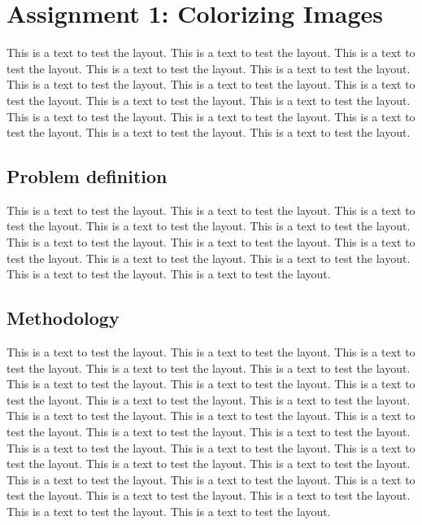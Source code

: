 \documentclass[a4paper,psfig,subfigure,epsfig,fleqn,ausarbeitung,amssmb,float,caption,fontenc]{article}
\begin{document}
\section{Assignment 1: Colorizing Images}
\label{sec:assignment1}

This is a text to test the layout. This is a text to test the layout.
This is a text to test the layout.  This is a text to test the layout.
This is a text to test the layout. This is a text to test the layout.
This is a text to test the layout. This is a text to test the layout.
This is a text to test the layout.  This is a text to test the layout.
This is a text to test the layout. This is a text to test the layout.
This is a text to test the layout. This is a text to test the layout.
This is a text to test the layout.

\subsection{Problem definition}

This is a text to test the layout. This is a text to test the layout.
This is a text to test the layout.  This is a text to test the layout.
This is a text to test the layout. This is a text to test the layout.
This is a text to test the layout. This is a text to test the layout.
This is a text to test the layout.  This is a text to test the layout.
This is a text to test the layout. This is a text to test the layout.

\subsection{Methodology}

This is a text to test the layout. This is a text to test the layout.
This is a text to test the layout.  This is a text to test the layout.
This is a text to test the layout. This is a text to test the layout.
This is a text to test the layout. This is a text to test the layout.
This is a text to test the layout.  This is a text to test the layout.
This is a text to test the layout. This is a text to test the layout.
This is a text to test the layout. This is a text to test the layout.
This is a text to test the layout.  This is a text to test the layout.
This is a text to test the layout. This is a text to test the layout.
This is a text to test the layout. This is a text to test the layout.
This is a text to test the layout.  This is a text to test the layout.
This is a text to test the layout. This is a text to test the layout.
This is a text to test the layout. This is a text to test the layout.
This is a text to test the layout.
\end{document}
